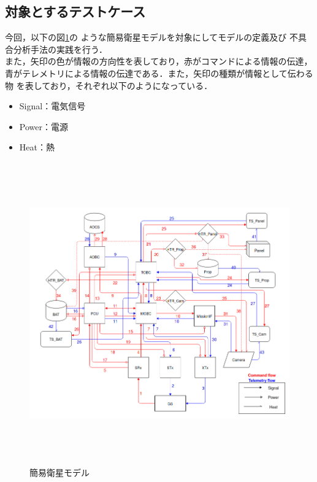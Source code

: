 \documentclass[11pt]{jsreport}
\begin{document}
\subsection{対象とするテストケース}
今回，以下の図\ref{fig:simple_sat}の
ような簡易衛星モデルを対象にしてモデルの定義及び
不具合分析手法の実践を行う．\\
また，矢印の色が情報の方向性を表しており，赤がコマンドによる情報の伝達，
青がテレメトリによる情報の伝達である．また，矢印の種類が情報として伝わる物
を表しており，それぞれ以下のようになっている．
\begin{itemize}
   \item Signal：電気信号
   \item Power：電源
   \item Heat：熱
\end{itemize}
\begin{figure}[H]
   \centering
      \includegraphics[height=13.0cm]{figure/satellite_diagram.PNG}
      \caption{簡易衛星モデル}
      \label{fig:simple_sat}
\end{figure}
\end{document}
